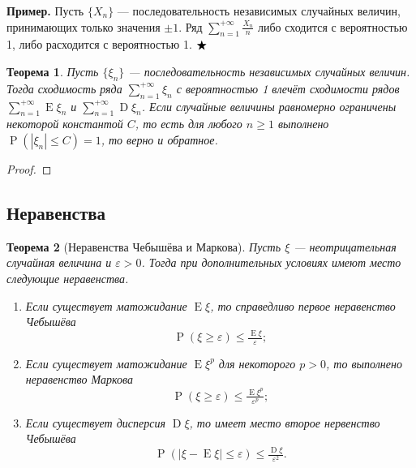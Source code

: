 \documentclass[12pt]{article}
\newtheorem{theorem}{Теорема}
\numberwithin{theorem}{section}
\theoremstyle{definition}
\newenvironment{example}{\indent \textbf{Пример.}}{$ \hfill \bigstar $}
\newcommand{\prob}{\operatorname{P}}
\newcommand{\expect}{\operatorname{E}}
\newcommand{\disp}{\operatorname{D}}
\begin{document}
	\begin{example}
		Пусть $ \{X_n\} $ --- последовательность независимых случайных величин, принимающих только значения $ \pm 1 $.
		Ряд $ \sum\limits_{n = 1}^{+\infty} \tfrac{X_n}{n} $ либо сходится с вероятностью 1,
		либо расходится с вероятностью 1.
	\end{example}
	
	\begin{theorem}
		Пусть $ \{\xi_n\} $ --- последовательность независимых случайных величин.
		Тогда сходимость ряда $ \sum\limits_{n = 1}^{+\infty} \xi_n $ с вероятностью 1
		влечёт сходимости рядов $ \sum\limits_{n = 1}^{+\infty} \expect\xi_n $
		и $ \sum\limits_{n = 1}^{+\infty} \disp\xi_n $.
		Если случайные величины равномерно ограничены некоторой константой $ C $,
		то есть для любого $ n \geqslant 1 $ выполнено $ \prob(|\xi_n| \leqslant C) = 1 $,
		то верно и обратное.
	\end{theorem}
	
	\begin{proof}
		
		
	\end{proof}
	
	\subsection{Неравенства}
	
	\begin{theorem}[Неравенства Чебышёва и Маркова] \label{inequalities}
		Пусть $ \xi $ --- неотрицательная случайная величина и $ \varepsilon > 0 $.
		Тогда при дополнительных условиях имеют место следующие неравенства.
		\begin{enumerate}
			\item Если существует матожидание $ \expect\xi $, 
			то справедливо первое неравенство Чебышёва 
			$$ \prob(\xi \geqslant \varepsilon) \leqslant \tfrac{\expect\xi}{\varepsilon}; $$
			\label{inequalities | Chebyshev 1}
			\item Если существует матожидание $ \expect\xi^p $ для некоторого $ p > 0 $,
			то выполнено неравенство Маркова
			$$ \prob(\xi \geqslant \varepsilon) \leqslant \tfrac{\expect\xi^p}{\varepsilon^p}; $$
			\label{inequalities | Markov}
			\item Если существует дисперсия $ \disp\xi $, то имеет место второе нервенство Чебышёва
			$$ \prob(|\xi - \expect\xi| \leqslant \varepsilon) \leqslant \tfrac{\disp\xi}{\varepsilon^2}. $$
			\label{inequalities | Chebyshev 2}
		\end{enumerate}
	\end{theorem}
	
\end{document}
